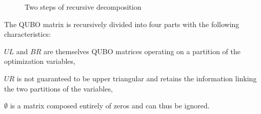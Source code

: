 \documentclass{ceurart}
\begin{document}
\begin{spacing}{1}
\begin{figure}
    \caption{Two steps of recursive decomposition}
    \label{fig:qubo}
\end{figure}

The QUBO matrix is recursively divided into four parts with the following characteristics:
\begin{enumerate*}
    \item $UL$ and $BR$ are themselves QUBO matrices operating on a partition of the optimization variables,
    \item $UR$ is not guaranteed to be upper triangular and retains the information linking the two partitions of the variables,
    \item $\emptyset$ is a matrix composed entirely of zeros and can thus be ignored.
\end{enumerate*}


\end{spacing}
\end{document}

